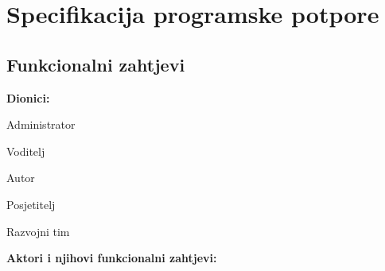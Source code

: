 \chapter{Specifikacija programske potpore}
		
	\section{Funkcionalni zahtjevi}
			
			\noindent \textbf{Dionici:}
			
			\begin{packed_enum}
				
				\item Administrator
				\item Voditelj			
				\item Autor
				\item Posjetitelj
				\item Razvojni tim
				
			\end{packed_enum}
			
			\noindent \textbf{Aktori i njihovi funkcionalni zahtjevi:}
			

